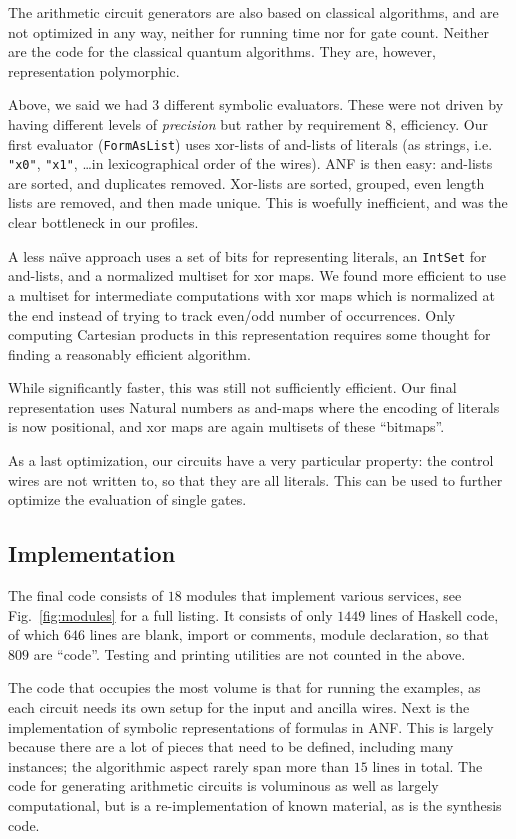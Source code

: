 \documentclass[sigplan,review]{acmart}
\theoremstyle{definition}
\begin{document}
The arithmetic circuit generators are also based on classical algorithms, and are
not optimized in any way, neither for running time nor for gate count. Neither are
the code for the classical quantum algorithms. They are, however, representation
polymorphic.

Above, we said we had $3$ different symbolic evaluators. These were not driven
by having different levels of \emph{precision} but rather by requirement $8$,
efficiency. Our first evaluator (\texttt{FormAsList}) uses xor-lists of
and-lists of literals (as strings, i.e.
\texttt{"x0"}, \texttt{"x1"}, \ldots in lexicographical order of the wires). ANF 
is then easy: and-lists are sorted, and duplicates removed. Xor-lists are sorted,
grouped, even length lists are removed, and then made unique. This is woefully
inefficient, and was the clear bottleneck in our profiles.

A less na\"{\i}ve approach uses a set of bits for representing literals, an
\texttt{IntSet} for and-lists, and a normalized multiset for xor maps. We found
more efficient to use a multiset for intermediate computations with xor maps
which is normalized at the end instead of trying to track even/odd number of
occurrences. Only computing Cartesian products in this representation requires
some thought for finding a reasonably efficient algorithm.

While significantly faster, this was still not sufficiently efficient. Our final
representation uses Natural numbers as and-maps where the encoding of literals is
now positional, and xor maps are again multisets of these ``bitmaps''.

As a last optimization, our circuits have a very particular property: the control
wires are not written to, so that they are all literals. This can be used to
further optimize the evaluation of single gates.

\subsection{Implementation}

The final code consists of $18$ modules that implement various
services, see Fig.~\ref{fig:modules} for a full listing. It consists of
only $1449$ lines of Haskell code, of which $646$ lines are blank, import or
comments, module declaration, so that $809$ are ``code''. Testing and printing
utilities are not counted in the above.

The code that occupies the most volume is that for running the examples, as each
circuit needs its own setup for the input and ancilla wires. Next is the implementation
of symbolic representations of formulas in ANF. This is largely because there are a
lot of pieces that need to be defined, including many instances; the algorithmic aspect
rarely span more than $15$ lines in total. The code for generating arithmetic circuits
is voluminous as well as largely computational, but is a re-implementation of known
material, as is the synthesis code.
\end{document}
